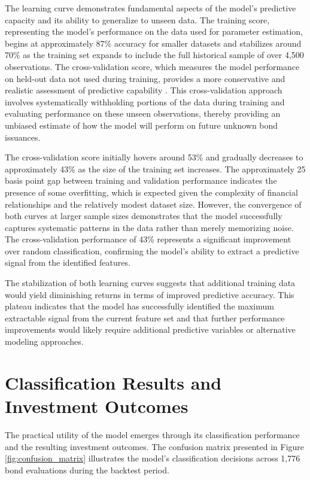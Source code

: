 The learning curve demonstrates fundamental aspects of the model's predictive capacity and its ability to generalize to unseen data. The training score, representing the model's performance on the data used for parameter estimation, begins at approximately 87\% accuracy for smaller datasets and stabilizes around 70\% as the training set expands to include the full historical sample of over 4,500 observations. The cross-validation score, which measures the model performance on held-out data not used during training, provides a more conservative and realistic assessment of predictive capability \parencite{Harrison2023EffectiveModels}. This cross-validation approach involves systematically withholding portions of the data during training and evaluating performance on these unseen observations, thereby providing an unbiased estimate of how the model will perform on future unknown bond issuances.

The cross-validation score initially hovers around 53\% and gradually decreases to approximately 43\% as the size of the training set increases. The approximately 25 basis point gap between training and validation performance indicates the presence of some overfitting, which is expected given the complexity of financial relationships and the relatively modest dataset size. However, the convergence of both curves at larger sample sizes demonstrates that the model successfully captures systematic patterns in the data rather than merely memorizing noise. The cross-validation performance of 43\% represents a significant improvement over random classification, confirming the model's ability to extract a predictive signal from the identified features.

The stabilization of both learning curves suggests that additional training data would yield diminishing returns in terms of improved predictive accuracy. This plateau indicates that the model has successfully identified the maximum extractable signal from the current feature set and that further performance improvements would likely require additional predictive variables or alternative modeling approaches.

\section{Classification Results and Investment Outcomes}

The practical utility of the model emerges through its classification performance and the resulting investment outcomes. The confusion matrix presented in Figure \ref{fig:confusion_matrix} illustrates the model's classification decisions across 1,776 bond evaluations during the backtest period.

